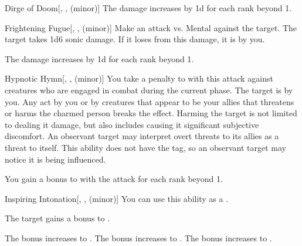 {\begin{freeability}{Dirge of Doom}[, ,  (minor)]
                \rankline
                The damage increases by \plus1d for each rank beyond 1.
            \end{freeability}

            \begin{freeability}{Frightening Fugue}[, ,  (minor)]
                Make an attack vs. Mental against the target.
                \hit The target takes 1d6 sonic damage.
                If it loses  from this damage, it is  by you.

                \rankline
                The damage increases by \plus1d for each rank beyond 1.
            \end{freeability}

            \begin{freeability}{Hypnotic Hymn}[, ,  (minor)]
                You take a  penalty to  with this attack against creatures who are engaged in combat during the current phase.
                \hit The target is  by you.
                Any act by you or by creatures that appear to be your allies that threatens or harms the charmed person breaks the effect.
                Harming the target is not limited to dealing it damage, but also includes causing it significant subjective discomfort.
                An observant target may interpret overt threats to its allies as a threat to itself.
                This ability does not have the  tag, so an observant target may notice it is being influenced.

                \rankline
                You gain a  bonus to  with the attack for each rank beyond 1.
            \end{freeability}

            \begin{freeability}{Inspiring Intonation}[, ,  (minor)]
                You can use this ability as a .

                The target gains a  bonus to .

                \rankline
                 The bonus increases to .
                 The bonus increases to .
                 The bonus increases to .
            \end{freeability}

}
